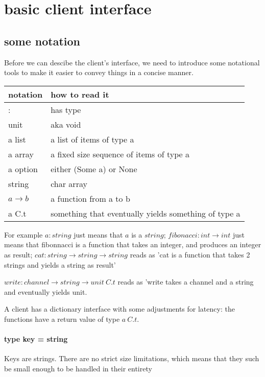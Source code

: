 \section{basic client interface}
\subsection{some notation}
Before we can descibe the client's interface, 
we need to introduce some notational tools to make it easier to convey things in a concise manner.

\begin{table}[h]
\begin{tabular}{|l|l|}
\hline
  notation & how to read it \\
\hline
  :                & has type \\
unit               & aka void  \\
a list             & a list of items of type a \\
a array            & a fixed size sequence of items of type a \\
a option           & either (Some a) or None \\
string             & char array \\

$ a \rightarrow b$ & a function from a to b \\
a C.t              & something that eventually yields something of type a \\
\hline
\end{tabular}
\end{table}

For example $ a : string $ just means that $a$ is a $string$;
$fibonacci : int \rightarrow int$ just means that fibonnacci is a function that takes an integer, and produces an integer as result;
$cat : string \rightarrow string \rightarrow string$ reads as 'cat is a function that takes 2 strings and yields a string as result'

$write: channel \rightarrow string \rightarrow unit\ C.t$ reads as 'write takes a channel and a string and eventually yields unit.


A client has a dictionary interface with some adjustments for latency: the functions have a return value of type $a\ C.t$.
\paragraph{type key = string}
Keys are strings.
There are no strict size limitations, which means that they such be small enough to be handled in their entirety
